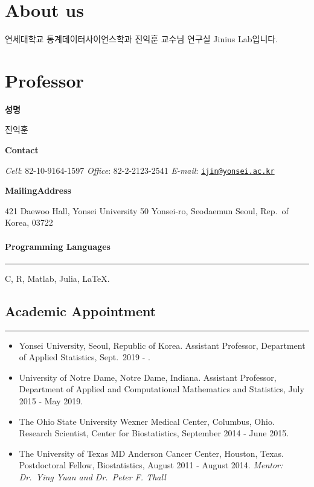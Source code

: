\documentclass[
]{book}
\author{}
\date{\vspace{-2.5em}}
\begin{document}
{
\setcounter{tocdepth}{1}
\tableofcontents
}
\hypertarget{about-us}{%
\chapter*{About us}\label{about-us}}

연세대학교 통계데이터사이언스학과 진익훈 교수님 연구실 Jinius Lab입니다.

\hypertarget{professor}{%
\chapter*{Professor}\label{professor}}

\textbf{성명}

진익훈

\textbf{Contact}

\emph{Cell}: 82-10-9164-1597
\emph{Office}: 82-2-2123-2541
\emph{E-mail}: \href{mailto:ijin@yonsei.ac.kr}{\nolinkurl{ijin@yonsei.ac.kr}}

\textbf{Mailing}\textbf{Address}

421 Daewoo Hall, Yonsei University
50 Yonsei-ro, Seodaemun
Seoul, Rep.~of Korea, 03722

\hypertarget{programming-languages}{%
\subsubsection*{Programming Languages}\label{programming-languages}}

\begin{center}\rule{0.5\linewidth}{0.5pt}\end{center}

C, R, Matlab, Julia, LaTeX.

\hypertarget{academic-appointment}{%
\section*{Academic Appointment}\label{academic-appointment}}

\begin{center}\rule{0.5\linewidth}{0.5pt}\end{center}

\begin{itemize}
\item
  Yonsei University, Seoul, Republic of Korea.
  Assistant Professor, Department of Applied Statistics, Sept.~2019 - .
\item
  University of Notre Dame, Notre Dame, Indiana.
  Assistant Professor, Department of Applied and Computational Mathematics and Statistics, July 2015 - May 2019.
\item
  The Ohio State University Wexner Medical Center, Columbus, Ohio.
  Research Scientist, Center for Biostatistics, September 2014 - June 2015.
\item
  The University of Texas MD Anderson Cancer Center, Houston, Texas.
  Postdoctoral Fellow, Biostatistics, August 2011 - August 2014.
  \emph{Mentor: Dr.~Ying Yuan and Dr.~Peter F. Thall}
\end{itemize}
\end{document}
